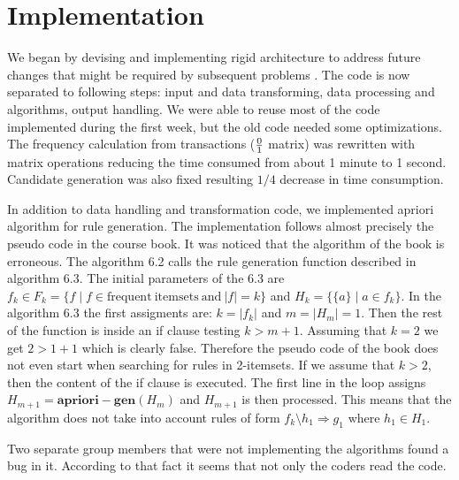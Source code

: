 \section{Implementation}
We began by devising and implementing rigid architecture to address future changes that might be required by subsequent problems . The code is now
separated to following steps: input and data transforming, data processing and algorithms, output handling.
We were able to reuse most of the code implemented during the first week, but the old
code needed some optimizations. The frequency calculation from transactions ($0 \over 1$ matrix) was rewritten with matrix operations
reducing the time consumed from about 1 minute to 1 second. Candidate generation was
also fixed resulting $1/4$ decrease in time consumption.\newline

In addition to data handling and transformation code, we implemented apriori algorithm 
for rule generation. The implementation follows almost precisely the pseudo code in the course book. 
It was noticed that the algorithm of the book is erroneous. 
The algorithm 6.2 calls the rule generation function described in algorithm 6.3.
The initial parameters of the 6.3 are $f_k \in F_k = \{f \mid f \in \mathrm{frequent\ itemsets\ and\ } |f|=k \}$ 
and $H_k = \{\{a\} \mid a \in f_k \}$. In the algorithm 6.3 the first assigments are:
$k = |f_k|$ and $m = |H_m| = 1$. Then the rest of the function is inside an if clause
testing $k > m + 1$. Assuming that $k=2$ we get $2 > 1+1$ which is clearly false. 
Therefore the pseudo code of the book does not even start when searching for rules in 2-itemsets.
If we assume that $k>2$, then the content of the if clause is executed. The first 
line in the loop assigns $H_{m+1} = \mathbf{apriori-gen}(H_m)$ and $H_{m+1}$ is then processed.
This means that the algorithm does not take into account rules of form $f_k \setminus h_1 \Rightarrow g_1$ where $h_1 \in H_1$.
\newline

Two separate group members that were not implementing the algorithms found a bug in it. 
According to that fact it seems that not only the coders read the code.
